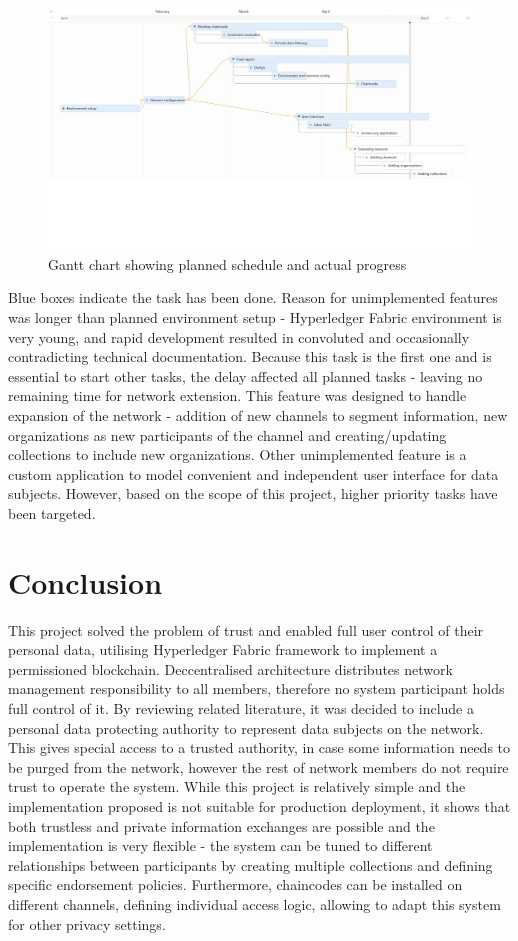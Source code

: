 \documentclass[12pt]{article}
\begin{document}
    \begin{figure}[H]
        \includegraphics[width=\textwidth]{gantt.png}
        \caption{Gantt chart showing planned schedule and actual progress}
        \label{fig:gantt}
    \end{figure}

    Blue boxes indicate the task has been done. Reason for unimplemented features was longer than planned environment setup - Hyperledger Fabric environment is very young, and rapid development resulted in convoluted and occasionally contradicting technical documentation. Because this task is the first one and is essential to start other tasks, the delay affected all planned tasks - leaving no remaining time for network extension. This feature was designed to handle expansion of the network - addition of new channels to segment information, new organizations as new participants of the channel and creating/updating collections to include new organizations. Other unimplemented feature is a custom application to model convenient and independent user interface for data subjects. However, based on the scope of this project, higher priority tasks have been targeted.

    \section{Conclusion}
    This project solved the problem of trust and enabled full user control of their personal data, utilising Hyperledger Fabric framework to implement a permissioned blockchain. Deccentralised architecture distributes network management responsibility to all members, therefore no system participant holds full control of it. By reviewing related literature, it was decided to include a personal data protecting authority to represent data subjects on the network. This gives special access to a trusted authority, in case some information needs to be purged from the network, however the rest of network members do not require trust to operate the system. While this project is relatively simple and the implementation proposed is not suitable for production deployment, it shows that both trustless and private information exchanges are possible and the implementation is very flexible - the system can be tuned to different relationships between participants by creating multiple collections and defining specific endorsement policies. Furthermore, chaincodes can be installed on different channels, defining individual access logic, allowing to adapt this system for other privacy settings.
\end{document}
